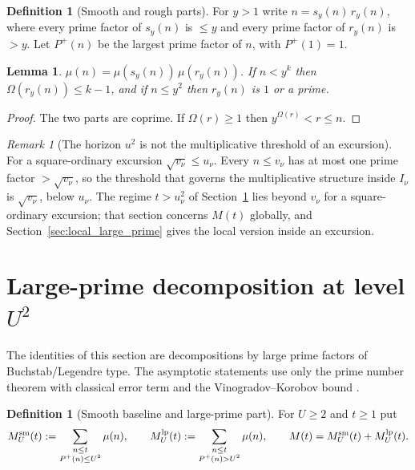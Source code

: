 \documentclass[11pt]{amsart}
\numberwithin{equation}{section}
\theoremstyle{plain}
\newtheorem{lemma}[theorem]{Lemma}
\theoremstyle{definition}
\newtheorem{definition}[theorem]{Definition}
\theoremstyle{remark}
\newtheorem{remark}[theorem]{Remark}
\newcommand{\Pp}{P^{+}}
\begin{document}
\begin{definition}[Smooth and rough parts]
\label{def:smooth_rough}
For $y>1$ write $n=s_y(n)\,r_y(n)$, where every prime factor of $s_y(n)$
is $\le y$ and every prime factor of $r_y(n)$ is $>y$. Let $\Pp(n)$ be the
largest prime factor of $n$, with $\Pp(1)=1$.
\end{definition}

\begin{lemma}
\label{lem:rough_part}
$\mu(n)=\mu(s_y(n))\,\mu(r_y(n))$. If $n<y^k$ then $\Omega(r_y(n))\le k-1$,
and if $n\le y^2$ then $r_y(n)$ is $1$ or a prime.
\end{lemma}

\begin{proof}
The two parts are coprime. If $\Omega(r)\ge1$ then $y^{\Omega(r)}<r\le n$.
\end{proof}

\begin{remark}[The horizon $u^2$ is not the multiplicative threshold of an excursion]
\label{rem:horizon_inactive}
For a square-ordinary excursion $\sqrt{v_\nu}\le u_\nu$. Every $n\le v_\nu$
has at most one prime factor $>\sqrt{v_\nu}$, so the threshold that governs
the multiplicative structure inside $I_\nu$ is $\sqrt{v_\nu}$, below
$u_\nu$. The regime $t>u_\nu^2$ of Section~\ref{sec:prime_copy_propagation}
lies beyond $v_\nu$ for a square-ordinary excursion; that section concerns
$M(t)$ globally, and Section~\ref{sec:local_large_prime} gives the local
version inside an excursion.
\end{remark}

\section{Large-prime decomposition at level \texorpdfstring{$U^2$}{U^2}}
\label{sec:prime_copy_propagation}

The identities of this section are decompositions by large prime factors of
Buchstab/Legendre type. The asymptotic statements use only the prime number
theorem with classical error term and the Vinogradov--Korobov bound
\cite{MontgomeryVaughan2007,Walfisz1963}.

\begin{definition}[Smooth baseline and large-prime part]
\label{def:baseline_channel}
For $U\ge2$ and $t\ge1$ put
\begin{equation}
\label{eq:baseline_channel_def}
  M^{\rm sm}_U(t):=\sum_{\substack{n\le t\\ \Pp(n)\le U^2}}\mu(n),\qquad
  M^{\rm lp}_U(t):=\sum_{\substack{n\le t\\ \Pp(n)>U^2}}\mu(n),\qquad
  M(t)=M^{\rm sm}_U(t)+M^{\rm lp}_U(t).
\end{equation}
\end{definition}
\end{document}
